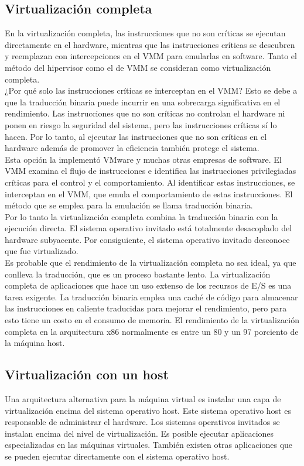 \subsection{Virtualización completa}
En la virtualización completa, las instrucciones que no son críticas se ejecutan directamente en el hardware, mientras que las instrucciones críticas se descubren y reemplazan con intercepciones en el VMM para emularlas en software. Tanto el método del hipervisor como el de VMM se consideran como virtualización completa.\\

¿Por qué solo las instrucciones críticas se interceptan en el VMM? Esto se debe a que la traducción binaria puede incurrir en una sobrecarga significativa en el rendimiento. Las instrucciones que no son críticas no controlan el hardware ni ponen en riesgo la seguridad del sistema, pero las instrucciones críticas sí lo hacen. Por lo tanto, al ejecutar las instrucciones que no son críticas en el hardware además de promover la eficiencia también protege el sistema.\\

Esta opción la implementó VMware y muchas otras empresas de software. El VMM examina el flujo de instrucciones e identifica las instrucciones privilegiadas críticas para el control y el comportamiento. Al identificar estas instrucciones, se interceptan en el VMM, que emula el comportamiento de estas instrucciones. El método que se emplea para la emulación se llama traducción binaria.\\

Por lo tanto la virtualización completa combina la traducción binaria con la ejecución directa. El sistema operativo invitado está totalmente desacoplado del hardware subyacente. Por consiguiente, el sistema operativo invitado desconoce que fue virtualizado.\\

Es probable que el rendimiento de la virtualización completa no sea ideal, ya que conlleva la traducción, que es un proceso bastante lento. La virtualización completa de aplicaciones que hace un uso extenso de los recursos de E/S es una tarea exigente. La traducción binaria emplea una caché de código para almacenar las instrucciones en caliente traducidas para mejorar el rendimiento, pero para esto tiene un costo en el consumo de memoria. El rendimiento de la virtualización completa en la arquitectura x86 normalmente es entre un 80 y un 97 porciento de la máquina host.

\subsection{Virtualización con un host}
Una arquitectura alternativa para la máquina virtual es instalar una capa de virtualización encima del sistema operativo host. Este sistema operativo host es responsable de administrar el hardware. Los sistemas operativos invitados se instalan encima del nivel de virtualización. Es posible ejecutar aplicaciones especializadas en las máquinas virtuales. También existen otras aplicaciones que se pueden ejecutar directamente con el sistema operativo host.\\

